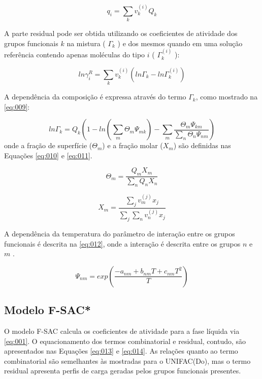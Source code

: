 \begin{equation}\label{eq:007}
q_i = \displaystyle\sum_kv_k^{(i)}Q_k
\end{equation}

A parte residual pode ser obtida utilizando os coeficientes de atividade dos
grupos funcionais $k$  na mistura ( $\Gamma_k$ ) e dos mesmos quando em uma
solução referência contendo apenas moléculas do tipo $i$ ( $\Gamma_k^{(i)}$ ):


\begin{equation}\label{eq:008}
ln\gamma_i^R = \displaystyle\sum_kv^{(i)}_k\left ( ln\Gamma_k -
ln\Gamma_k^{(i)} \right )
\end{equation}

A dependência da composição é expressa através do termo $\Gamma_k$, como
mostrado na \autoref{eq:009}:

\begin{equation}\label{eq:009}
ln\Gamma_k = Q_k\left ( 1 - ln\left ( \displaystyle\sum_m\Theta_m\Psi_{mk}
\right ) -
\displaystyle\sum_m\frac{\Theta_m\Psi_{km}}{\displaystyle\sum_n\Theta_n\Psi_{nm}}
\right )
\end{equation}
onde a fração de superfície ($\Theta_m$) e a fração molar ($X_m$) são definidas
nas Equações \ref{eq:010} e \ref{eq:011}.

\begin{equation}\label{eq:010}
\Theta_m = \frac{Q_mX_m}{\displaystyle\sum_nQ_nX_n}
\end{equation}

\begin{equation}\label{eq:011}
X_m =
\frac{\displaystyle\sum_jv^{(j)}_mx_j}{\displaystyle\sum_j\sum_nv_n^{(j)}x_j}
\end{equation}

A dependência da temperatura do parâmetro de interação entre os grupos
funcionais é descrita na \autoref{eq:012}, onde a interação é descrita entre os
grupos $n$ e $m$ .

\begin{equation}\label{eq:012}
\Psi_{nm} = exp \left ( \frac{-a_{nm} + b_{nm}T + c_{nm}T^2}{T} \right)
\end{equation}


\subsection{Modelo F-SAC*}

O modelo F-SAC calcula os coeficientes de atividade para a fase líquida via
\autoref{eq:001}.
O equacionamento dos termos combinatorial e residual, contudo, são apresentados nas 
Equações \ref{eq:013} e \ref{eq:014}. As relações quanto ao termo combinatorial
são semelhantes às mostradas para o UNIFAC(Do), mas o termo residual apresenta perfis de carga 
geradas pelos grupos funcionais presentes.

